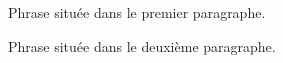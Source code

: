\documentclass{article}
\begin{document}
Phrase située dans le premier paragraphe.

Phrase située dans le deuxième paragraphe.
\end{document}
